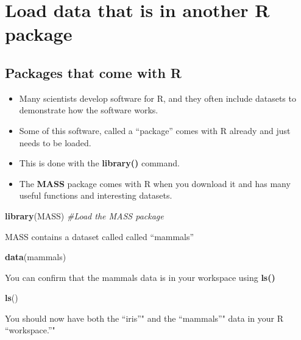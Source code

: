 \documentclass[]{book}
\newenvironment{Shaded}{\begin{snugshade}}{\end{snugshade}}
\newcommand{\KeywordTok}[1]{\textcolor[rgb]{0.13,0.29,0.53}{\textbf{#1}}}
\newcommand{\CommentTok}[1]{\textcolor[rgb]{0.56,0.35,0.01}{\textit{#1}}}
\newcommand{\NormalTok}[1]{#1}
\providecommand{\tightlist}{%
  \setlength{\itemsep}{0pt}\setlength{\parskip}{0pt}}
\theoremstyle{definition}
\theoremstyle{definition}
\theoremstyle{definition}
\theoremstyle{remark}
\begin{document}
\section{Load data that is in another R
package}\label{load-data-that-is-in-another-r-package}

\subsection{Packages that come with R}\label{packages-that-come-with-r}

\begin{itemize}
\tightlist
\item
  Many scientists develop software for R, and they often include
  datasets to demonstrate how the software works.\\
\item
  Some of this software, called a ``package'' comes with R already and
  just needs to be loaded.\\
\item
  This is done with the \textbf{library()} command.
\item
  The \textbf{MASS} package comes with R when you download it and has
  many useful functions and interesting datasets.
\end{itemize}

\begin{Shaded}
\begin{Highlighting}[]
\KeywordTok{library}\NormalTok{(MASS) }\CommentTok{#Load the MASS package}
\end{Highlighting}
\end{Shaded}

MASS contains a dataset called called ``mammals''

\begin{Shaded}
\begin{Highlighting}[]
\KeywordTok{data}\NormalTok{(mammals)}
\end{Highlighting}
\end{Shaded}

You can confirm that the mammals data is in your workspace using
\textbf{ls()}

\begin{Shaded}
\begin{Highlighting}[]
\KeywordTok{ls}\NormalTok{()}
\end{Highlighting}
\end{Shaded}

You should now have both the ``iris''" and the ``mammals''" data in your
R ``workspace.''"
\end{document}
